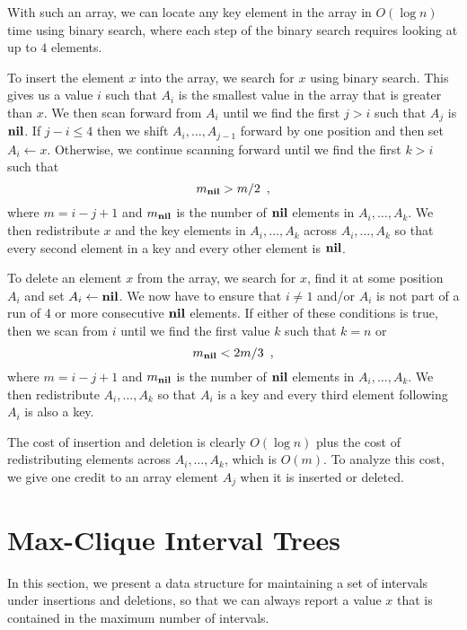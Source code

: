 With such an array, we can locate any key element in the array in
$O(\log n)$ time using binary search, where each step of the binary
search requires looking at up to $4$ elements.

To insert the element $x$ into the array, we search for $x$ using
binary search. This gives us a value $i$ such that $A_i$ is the
smallest value in the array that is greater than $x$.  We then scan
forward from $A_i$ until we find the first $j>i$ such that $A_j$ is
$\mathbf{nil}$.  If $j-i\le 4$ then we shift $A_i,\ldots,A_{j-1}$ forward by
one position and then set $A_i\gets x$.  Otherwise, we continue
scanning forward until we find the first $k>i$ such that
\[
      m_{\mathbf{nil}} > m/2 \enspace ,
\]
where $m=i-j+1$ and $m_{\mathbf{nil}}$ is the number of $\mathbf{nil}$ elements in
$A_i,\ldots,A_k$.  We then redistribute $x$ and the key elements in
$A_i,\ldots,A_k$ across $A_i,\ldots,A_k$ so that every second element
in a key and every other element is $\mathbf{nil}$.

To delete an element $x$ from the array, we search for $x$, find it at
some position $A_i$ and set $A_i\gets\mathbf{nil}$.  We now have to ensure
that $i\neq 1$ and/or $A_i$ is not part of a run of 4 or more
consecutive $\mathbf{nil}$ elements.  If either of these conditions is true,
then we scan from $i$ until we find the first value $k$ such that
$k=n$ or
\[
      m_{\mathbf{nil}} < 2m/3 \enspace ,
\]
where $m=i-j+1$ and $m_{\mathbf{nil}}$ is the number of $\mathbf{nil}$ elements in
$A_i,\ldots,A_k$.  We then redistribute $A_i,\ldots,A_k$ so that $A_i$
is a key and every third element following $A_i$ is also a key.

The cost of insertion and deletion is clearly $O(\log n)$ plus the
cost of redistributing elements across $A_i,\ldots,A_k$, which is
$O(m)$.  To analyze this cost, we give one credit to an array element
$A_j$ when it is inserted or deleted.



\section{Max-Clique Interval Trees}

In this section, we present a data structure for maintaining a set of
intervals under insertions and deletions, so that we can always report
a value $x$ that is contained in the maximum number of intervals.

